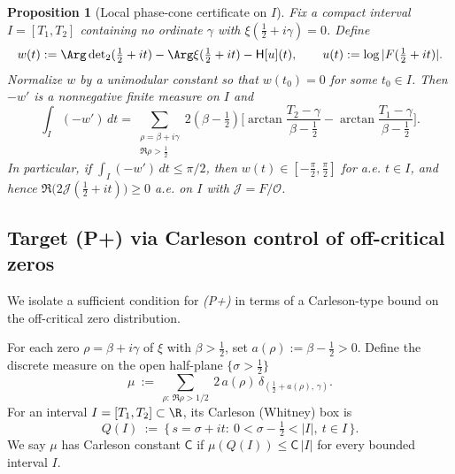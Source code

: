 \documentclass[11pt]{article}
\newtheorem{proposition}[theorem]{Proposition}
\theoremstyle{remark}
\DeclareMathOperator{\dettwo}{det_2}
\begin{document}
\begin{proposition}[Local phase-cone certificate on \(I\)]
Fix a compact interval $I=[T_1,T_2]$ containing no ordinate \(\gamma\) with \(\xi(\tfrac12+i\gamma)=0\). Define
\[
 w(t):=\Arg\dettwo(\tfrac12+it)-\Arg\xi(\tfrac12+it)-\mathsf H[u](t),\qquad u(t):=\log|F(\tfrac12+it)|.
\]
Normalize $w$ by a unimodular constant so that $w(t_0)=0$ for some $t_0\in I$. Then $-w'$ is a nonnegative finite measure on $I$ and
\[
 \int_I (-w')\,dt=\sum_{\substack{\rho=\beta+i\gamma\\ \Re\rho>\tfrac12}}\! 2(\beta-\tfrac12)\Big[\arctan\frac{T_2-\gamma}{\beta-\tfrac12}-\arctan\frac{T_1-\gamma}{\beta-\tfrac12}\Big].
\]
In particular, if \(\displaystyle \int_I (-w')\,dt\le \pi/2\), then $w(t)\in[-\tfrac\pi2,\tfrac\pi2]$ for a.e. $t\in I$, and hence \(\Re\big(2\mathcal J(\tfrac12+it)\big)\ge 0\) a.e. on $I$ with \(\mathcal J=F/\mathcal O\).
\end{proposition}
\subsection*{Target (P+) via Carleson control of off-critical zeros}\label{subsec:Pplus-Carleson}
We isolate a sufficient condition for \emph{(P+)} in terms of a Carleson-type bound on the off-critical zero distribution.

\begin{definition}
For each zero \(\rho=\beta+i\gamma\) of \(\xi\) with \(\beta>\tfrac12\), set \(a(\rho):=\beta-\tfrac12>0\). Define the discrete measure on the open half-plane \(\{\sigma>\tfrac12\}\)
\[
 \mu\ :=\ \sum_{\rho:\,\Re\rho>1/2}\ 2\,a(\rho)\,\delta_{(\tfrac12+a(\rho),\,\gamma)}.
\]
For an interval \(I=[T_1,T_2]\subset\R\), its Carleson (Whitney) box is
\[
 Q(I)\ :=\ \Big\{\, s=\sigma+it:\ 0<\sigma-\tfrac12<|I|,\ t\in I\,\Big\}.
\]
We say \(\mu\) has Carleson constant \(\mathsf C\) if \(\mu(Q(I))\le \mathsf C\,|I|\) for every bounded interval \(I\).
\end{definition}
\end{document}
